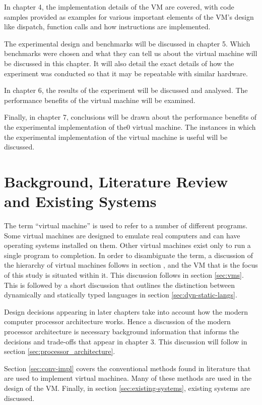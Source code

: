 \documentclass[english,a4paper,12pt]{report}
\begin{document}
In chapter 4, the implementation details of the VM are covered, with
code samples provided as examples for various important elements of
the VM's design like dispatch, function calls and how instructions are
implemented.

The experimental design and benchmarks will be discussed in chapter
5. Which benchmarks were chosen and what they can tell us about the
virtual machine will be discussed in this chapter. It will also detail
the exact details of how the experiment was conducted so that it may
be repeatable with similar hardware.

In chapter 6, the results of the experiment will be discussed and
analysed. The performance benefits of the virtual machine will be
examined. 

Finally, in chapter 7, conclusions will be drawn about the performance
benefits of the experimental implementation of the0 virtual
machine. The instances in which the experimental implementation of the
virtual machine is useful will be discussed.
\newpage{}

\chapter{Background, Literature Review and Existing Systems}
The term ``virtual machine'' is used to refer to a number of different
programs. Some virtual machines are designed to emulate real computers
and can have operating systems installed on them. Other virtual
machines exist only to run a single program to completion. In order to
disambiguate the term, a discussion of the hierarchy of virtual
machines follows in section , and the VM that is the focus of this
study is situated within it. This discussion follows in section
\ref{sec:vms}. This is followed by a short discussion that outlines
the distinction between dynamically and statically typed languages in
section \ref{sec:dyn-static-langs}.

Design decisions appearing in later chapters take into account how the
modern computer processor architecture works. Hence a discussion of
the modern processor architecture is necessary background information
that informs the decisions and trade-offs that appear in chapter
3. This discussion will follow in section
\ref{sec:processor_architecture}.

Section \ref{sec:conv-impl} covers the conventional methods found in
literature that are used to implement virtual machinea. Many of these
methods are used in the design of the VM. Finally, in section
\ref{sec:existing-systems}, existing systems are discussed.
\end{document}
